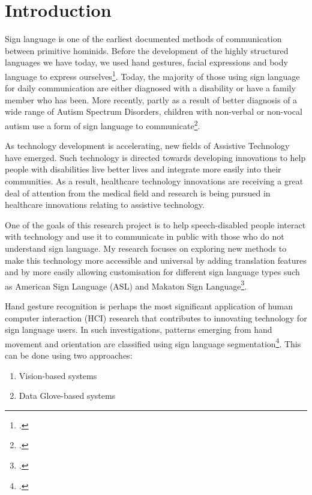 \chapter{Introduction}

Sign language is one of the earliest documented methods of communication between primitive hominids. Before the development of the highly structured languages we have today, we used hand gestures, facial expressions and body language to express ourselves\footcite{Premaratne2010}. Today, the majority of those using sign language for daily communication are either diagnosed with a disability or have a family member who has been. More recently, partly as a result of better diagnosis of a wide range of Autism Spectrum Disorders, children with non-verbal or non-vocal autism use a form of sign language to communicate\footcite{bonvillian1981sign}.

As technology development is accelerating, new fields of Assistive Technology have emerged. Such technology is directed towards developing innovations to help people with disabilities live better lives and integrate more easily into their communities. As a result, healthcare technology innovations are receiving a great deal of attention from the medical field and research is being pursued in healthcare innovations relating to assistive technology.

One of the goals of this research project is to help speech-disabled people interact with technology and use it to communicate in public with those who do not understand sign language. My research focuses on exploring new methods to make this technology more accessible and universal by adding translation features and by more easily allowing customisation for different sign language types such as American Sign Language (ASL) and Makaton Sign Language\footcite{Makaton}. 

Hand gesture recognition is perhaps the most significant application of human computer interaction (HCI) research that contributes to innovating technology for sign language users. In such investigations, patterns emerging from hand movement and orientation are classified using sign language segmentation\footcite{Han2009}. This can be done using two approaches:

\begin{enumerate}
    \item{Vision-based systems}
    \item{Data Glove-based systems}
\end{enumerate}

